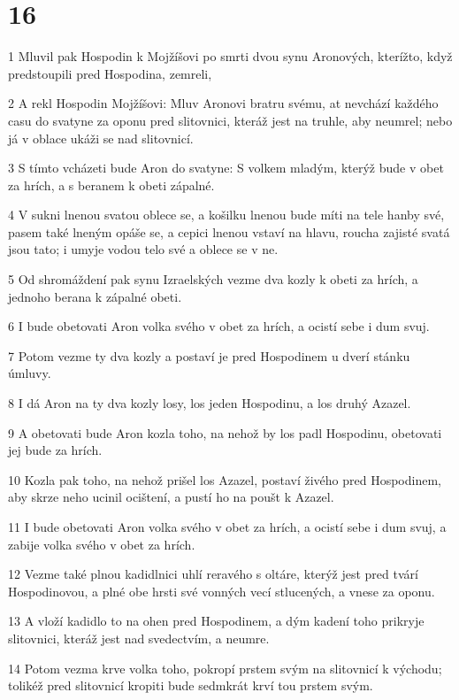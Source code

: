 \chapter{16}

\par 1 Mluvil pak Hospodin k Mojžíšovi po smrti dvou synu Aronových, kterížto, když predstoupili pred Hospodina, zemreli,
\par 2 A rekl Hospodin Mojžíšovi: Mluv Aronovi bratru svému, at nevchází každého casu do svatyne za oponu pred slitovnici, kteráž jest na truhle, aby neumrel; nebo já v oblace ukáži se nad slitovnicí.
\par 3 S tímto vcházeti bude Aron do svatyne: S volkem mladým, kterýž bude v obet za hrích, a s beranem k obeti zápalné.
\par 4 V sukni lnenou svatou oblece se, a košilku lnenou bude míti na tele hanby své, pasem také lneným opáše se, a cepici lnenou vstaví na hlavu, roucha zajisté svatá jsou tato; i umyje vodou telo své a oblece se v ne.
\par 5 Od shromáždení pak synu Izraelských vezme dva kozly k obeti za hrích, a jednoho berana k zápalné obeti.
\par 6 I bude obetovati Aron volka svého v obet za hrích, a ocistí sebe i dum svuj.
\par 7 Potom vezme ty dva kozly a postaví je pred Hospodinem u dverí stánku úmluvy.
\par 8 I dá Aron na ty dva kozly losy, los jeden Hospodinu, a los druhý Azazel.
\par 9 A obetovati bude Aron kozla toho, na nehož by los padl Hospodinu, obetovati jej bude za hrích.
\par 10 Kozla pak toho, na nehož prišel los Azazel, postaví živého pred Hospodinem, aby skrze neho ucinil ocištení, a pustí ho na poušt k Azazel.
\par 11 I bude obetovati Aron volka svého v obet za hrích, a ocistí sebe i dum svuj, a zabije volka svého v obet za hrích.
\par 12 Vezme také plnou kadidlnici uhlí reravého s oltáre, kterýž jest pred tvárí Hospodinovou, a plné obe hrsti své vonných vecí stlucených, a vnese za oponu.
\par 13 A vloží kadidlo to na ohen pred Hospodinem, a dým kadení toho prikryje slitovnici, kteráž jest nad svedectvím, a neumre.
\par 14 Potom vezma krve volka toho, pokropí prstem svým na slitovnicí k východu; tolikéž pred slitovnicí kropiti bude sedmkrát krví tou prstem svým.
